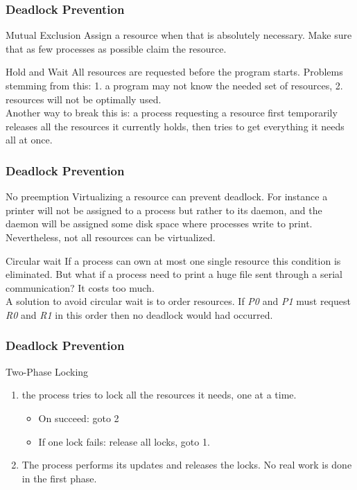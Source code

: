 \begin{frame}
  \frametitle{Deadlock Prevention}
  \begin{block}{Mutual Exclusion}
    Assign a resource when that is absolutely necessary. Make sure that as few processes as possible claim the resource.
  \end{block}
  \begin{block}{Hold and Wait}
    All resources are requested before the program starts. Problems stemming from this: 1. a program may not know the needed set of resources, 2. resources will not be optimally used.\\
    Another way to break this is: a process requesting a resource first temporarily releases all the resources it currently holds, then tries to get everything it needs all at once.
  \end{block}
\end{frame}

\begin{frame}
  \frametitle{Deadlock Prevention}
  \begin{block}{No preemption}
    Virtualizing a resource can prevent deadlock. For instance a printer will not be assigned to a process but rather to its daemon, and the daemon will be assigned some disk space where processes write to print. Nevertheless, not all resources can be virtualized.
  \end{block}
  \begin{block}{Circular wait}
    If a process can own at most one single resource this condition is eliminated. But what if a process need to print a huge file sent through a serial communication? It costs too much.\\
    A solution to avoid circular wait is to order resources. If \emph{P0} and \emph{P1} must request \emph{R0} and \emph{R1} in this order then no deadlock would had occurred.
  \end{block}
\end{frame}

\begin{frame}
  \frametitle{Deadlock Prevention}
  \begin{block}{Two-Phase Locking}
    \begin{enumerate}
      \item the process tries to lock all the resources it needs, one at a time.
        \begin{itemize}
          \item On succeed: goto 2
          \item If one lock fails: release all locks, goto 1.
        \end{itemize}
      \item The process performs its updates and releases the locks. No real work is done in the first phase.
    \end{enumerate}
  \end{block}
\end{frame}

